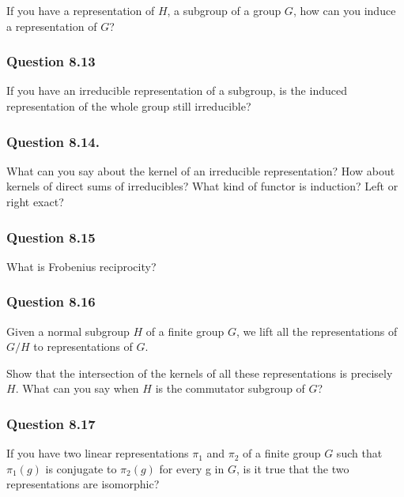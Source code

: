 If you have a representation of \(H\), a subgroup of a group \(G\), how
can you induce a representation of \(G\)?

\hypertarget{question-8.13}{%
\subsubsection{Question 8.13}\label{question-8.13}}

If you have an irreducible representation of a subgroup, is the induced
representation of the whole group still irreducible?

\hypertarget{question-8.14.}{%
\subsubsection{Question 8.14.}\label{question-8.14.}}

What can you say about the kernel of an irreducible representation? How
about kernels of direct sums of irreducibles? What kind of functor is
induction? Left or right exact?

\hypertarget{question-8.15}{%
\subsubsection{Question 8.15}\label{question-8.15}}

What is Frobenius reciprocity?

\hypertarget{question-8.16}{%
\subsubsection{Question 8.16}\label{question-8.16}}

Given a normal subgroup \(H\) of a finite group \(G\), we lift all the
representations of \(G/H\) to representations of \(G\).

Show that the intersection of the kernels of all these representations
is precisely \(H\). What can you say when \(H\) is the commutator
subgroup of \(G\)?

\hypertarget{question-8.17}{%
\subsubsection{Question 8.17}\label{question-8.17}}

If you have two linear representations \(\pi_1\) and \(\pi_2\) of a
finite group \(G\) such that \(\pi_1(g)\) is conjugate to \(\pi_2(g)\)
for every g in \(G\), is it true that the two representations are
isomorphic?


